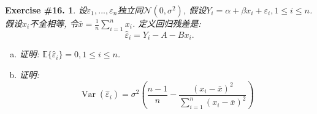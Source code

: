 \documentclass[UTF8, a4paper]{article}
\newtheorem{exercise}{Exercise \#16.}
\begin{document}
\begin{framed}
\begin{exercise}
设\(\varepsilon_1,...,\varepsilon_n\)独立同\(\mathcal{N}(0, \sigma^2)\), 假设\(Y_i =  \alpha + \beta x_i + \varepsilon_i, 1 \leq i \leq n\).
假设\(x_i\)不全相等, 令\(\bar{x} = \frac{1}{n}\sum_{i = 1}^n x_i\).
定义回归残差是:
$$
\hat{\varepsilon}_i=Y_i-A-B x_i.
$$
\begin{enumerate}[a)]
    \item 证明: \(\mathbb{E}\{\hat{\varepsilon}_i\} = 0, 1\leq i\leq n\).
    \item 证明: $$
\operatorname{Var}\left(\hat{\varepsilon}_i\right)=\sigma^2\left(\frac{n-1}{n}-\frac{\left(x_i-\bar{x}\right)^2}{\sum_{i=1}^n\left(x_i-\bar{x}\right)^2}\right)
$$
\end{enumerate}
\end{exercise}
\end{framed}
\end{document}
